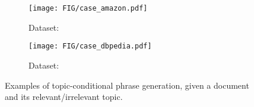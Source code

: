 \begin{figure}[t]
\centering
\begin{subfigure}{\linewidth}
    \centering
    \texttt{[image: FIG/case\_amazon.pdf]}  
    \caption{Dataset: \amazon}
\end{subfigure}
\begin{subfigure}{\linewidth}
    \centering
    \texttt{[image: FIG/case\_dbpedia.pdf]}
    \caption{Dataset: \dbpedia}
\end{subfigure}
\caption{Examples of topic-conditional phrase generation, given a document and its relevant/irrelevant topic.}
\label{fig:examples}
\end{figure}